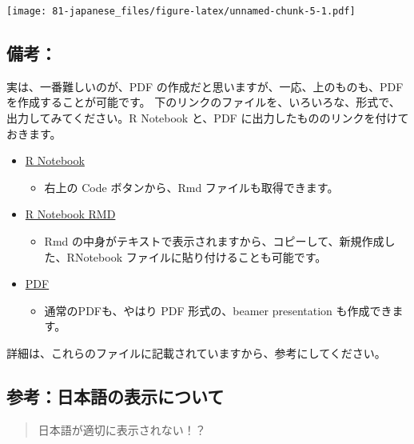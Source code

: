 \documentclass[
]{bxjsbook}
\providecommand{\tightlist}{%
  \setlength{\itemsep}{0pt}\setlength{\parskip}{0pt}}
\theoremstyle{definition}
\theoremstyle{definition}
\theoremstyle{definition}
\theoremstyle{definition}
\theoremstyle{remark}
\begin{document}
\texttt{[image: 81-japanese\_files/figure-latex/unnamed-chunk-5-1.pdf]}

\hypertarget{ux5099ux8003-1}{%
\subsection{備考：}\label{ux5099ux8003-1}}

実は、一番難しいのが、PDF の作成だと思いますが、一応、上のものも、PDF を作成することが可能です。
下のリンクのファイルを、いろいろな、形式で、出力してみてください。R Notebook と、PDF に出力したもののリンクを付けておきます。

\begin{itemize}
\tightlist
\item
  \href{https://ds-sl.github.io/intro2r/Rmarkdown-J.nb.html}{R Notebook}

  \begin{itemize}
  \tightlist
  \item
    右上の Code ボタンから、Rmd ファイルも取得できます。
  \end{itemize}
\item
  \href{https://ds-sl.github.io/intro2r/Rmarkdown-J.html}{R Notebook RMD}

  \begin{itemize}
  \tightlist
  \item
    Rmd の中身がテキストで表示されますから、コピーして、新規作成した、RNotebook ファイルに貼り付けることも可能です。
  \end{itemize}
\item
  \href{https://ds-sl.github.io/intro2r/Rmarkdown-J.pdf}{PDF}

  \begin{itemize}
  \tightlist
  \item
    通常のPDFも、やはり PDF 形式の、beamer presentation も作成できます。
  \end{itemize}
\end{itemize}

詳細は、これらのファイルに記載されていますから、参考にしてください。

\hypertarget{ux53c2ux8003ux65e5ux672cux8a9eux306eux8868ux793aux306bux3064ux3044ux3066}{%
\subsection{参考：日本語の表示について}\label{ux53c2ux8003ux65e5ux672cux8a9eux306eux8868ux793aux306bux3064ux3044ux3066}}

\begin{quote}
日本語が適切に表示されない！？
\end{quote}
\end{document}
